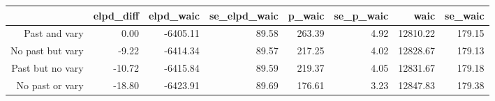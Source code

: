 \begin{table}[ht]
\centering
\begin{tabular}{rrrrrrrr}
  \hline
 & elpd\_diff & elpd\_waic & se\_elpd\_waic & p\_waic & se\_p\_waic & waic & se\_waic \\ 
  \hline
Past and vary & 0.00 & -6405.11 & 89.58 & 263.39 & 4.92 & 12810.22 & 179.15 \\ 
  No past but vary & -9.22 & -6414.34 & 89.57 & 217.25 & 4.02 & 12828.67 & 179.13 \\ 
  Past but no vary & -10.72 & -6415.84 & 89.59 & 219.37 & 4.05 & 12831.67 & 179.18 \\ 
  No past or vary & -18.80 & -6423.91 & 89.69 & 176.61 & 3.23 & 12847.83 & 179.38 \\ 
   \hline
\end{tabular}
\end{table}
